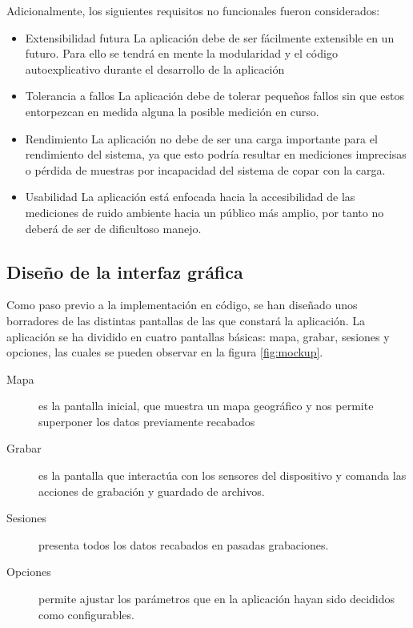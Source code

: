 Adicionalmente, los siguientes requisitos no funcionales fueron considerados:

\begin{itemize}
\item Extensibilidad futura
La aplicación debe de ser fácilmente extensible en un futuro. Para ello se tendrá en mente la modularidad y el código autoexplicativo durante el desarrollo de la aplicación 

\item Tolerancia a fallos
La aplicación debe de tolerar pequeños fallos sin que estos entorpezcan en medida alguna la posible medición en curso.

\item Rendimiento
La aplicación no debe de ser una carga importante para el rendimiento del sistema, ya que esto podría resultar en mediciones imprecisas o pérdida de muestras por incapacidad del sistema de copar con la carga.

\item Usabilidad
La aplicación está enfocada hacia la accesibilidad de las mediciones de ruido ambiente hacia un público más amplio, por tanto no deberá de ser de dificultoso manejo.

\end{itemize}
\subsection{Diseño de la interfaz gráfica}

Como paso previo a la implementación en código, se han diseñado unos borradores de las distintas pantallas de las que constará la aplicación. La aplicación se ha dividido en cuatro pantallas básicas: mapa, grabar, sesiones y opciones, las cuales se pueden observar en la figura \ref{fig:mockup}.

\begin{description}
\item[Mapa] es la pantalla inicial, que muestra un mapa geográfico y nos permite superponer los datos previamente recabados
\item[Grabar] es la pantalla que interactúa con los sensores del dispositivo y comanda las acciones de grabación y guardado de archivos.
\item[Sesiones] presenta todos los datos recabados en pasadas grabaciones.
\item[Opciones] permite ajustar los parámetros que en la aplicación hayan sido decididos como configurables.
\end{description} 

